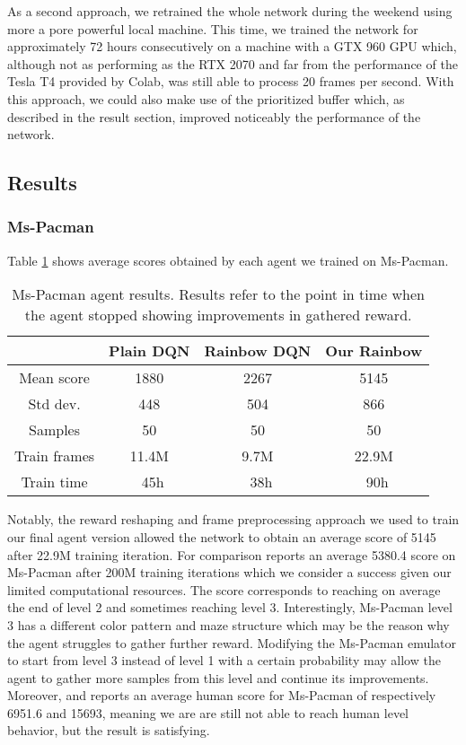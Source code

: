 \documentclass[10pt,twocolumn,letterpaper]{article}
\begin{document}
As a second approach, we retrained the whole network during the weekend using more a pore powerful local machine. This time, we trained the network for approximately 72 hours consecutively on a machine with a GTX 960 GPU which, although not as performing as the RTX 2070 and far from the performance of the Tesla T4 provided by Colab, was still able to process 20 frames per second. With this approach, we could also make use of the prioritized buffer which, as described in the result section, improved noticeably the performance of the network.

\subsection{Results}

\subsubsection{Ms-Pacman}

Table \ref{tab:pacman_results} shows average scores obtained by each agent we trained on Ms-Pacman.

\begin{table}
	\begin{center}
		\begin{tabular}{ |c|c|c|c| } 
			\hline
			 & Plain DQN & Rainbow DQN & Our Rainbow \\ 
			 \hline
			Mean score & 1880 & 2267 & 5145 \\
			Std dev. & 448 & 504 & 866 \\
			Samples & 50 & 50 & 50 \\
			Train frames & 11.4M & 9.7M & 22.9M \\
			Train time & ~45h & ~38h & ~90h \\
			\hline
		\end{tabular}
	\end{center}
	\caption{Ms-Pacman agent results. Results refer to the point in time when the agent stopped showing improvements in gathered reward.}
	\label{tab:pacman_results}
\end{table}

Notably, the reward reshaping and frame preprocessing approach we used to train our final agent version allowed the network to obtain an average score of 5145 after 22.9M training iteration. For comparison \cite{DBLP:journals/corr/abs-1710-02298} reports an average 5380.4 score on Ms-Pacman after 200M training iterations which we consider a success given our limited computational resources.
The score corresponds to reaching on average the end of level 2 and sometimes reaching level 3. Interestingly, Ms-Pacman level 3 has a different color pattern and maze structure which may be the reason why the agent struggles to gather further reward. Modifying the Ms-Pacman emulator to start from level 3 instead of level 1 with a certain probability may allow the agent to gather more samples from this level and continue its improvements.
Moreover, \cite{DBLP:journals/corr/WangFL15} and \cite{humancontrol} reports an average human score for Ms-Pacman of respectively 6951.6 and 15693, meaning we are are still not able to reach human level behavior, but the result is satisfying.
\end{document}
